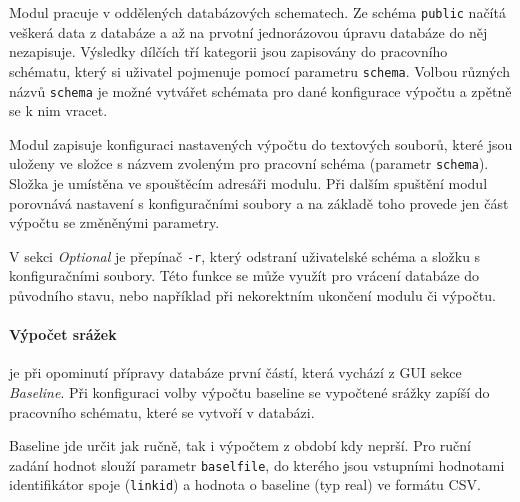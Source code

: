 \documentclass[a4paper,12pt,oneside]{report}
\begin{document}
Modul pracuje v oddělených databázových schematech. Ze schéma \texttt{public} načítá veškerá data z databáze a až na prvotní jednorázovou úpravu databáze do něj nezapisuje. Výsledky dílčích tří kategorii jsou zapisovány do pracovního schématu, který si uživatel pojmenuje pomocí parametru \texttt{schema}.  Volbou různých názvů  \texttt{schema} je možné vytvářet schémata pro dané konfigurace výpočtu a zpětně se k nim vracet.

Modul zapisuje konfiguraci nastavených výpočtu do textových souborů, které jsou uloženy ve složce s názvem zvoleným pro pracovní schéma (parametr \texttt{schema}). Složka je umístěna ve spouštěcím adresáři modulu. Při dalším spuštění modul porovnává nastavení s konfiguračními soubory a na základě toho provede jen   část výpočtu se změněnými parametry. 

V sekci \textit{Optional} je přepínač \texttt{-r}, který odstraní uživatelské schéma a složku s konfiguračními soubory. Této funkce se může využít pro vrácení databáze do původního stavu, nebo například při nekorektním ukončení modulu či výpočtu.


\paragraph*{Výpočet srážek} je při opominutí přípravy databáze první částí, která vychází z \acs{GUI} sekce \textit{Baseline}. Při konfiguraci volby výpočtu baseline se vypočtené srážky zapíší do pracovního schématu, které se vytvoří v databázi.

Baseline jde určit jak ručně,  tak i výpočtem z období kdy neprší. 
Pro ruční zadání hodnot slouží parametr \texttt{baselfile}, do kterého jsou vstupními hodnotami identifikátor spoje (\texttt{linkid}) a hodnota o baseline (typ real) ve formátu \acs{CSV}.
\end{document}
